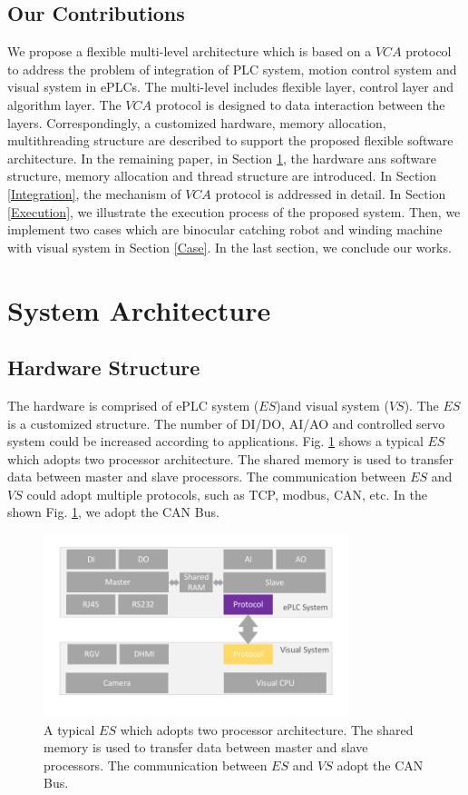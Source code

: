 \documentclass[journal,UTF8]{IEEEtran}
\begin{document}
\subsection{Our Contributions}
We propose a flexible multi-level architecture which is based on a $VCA$ protocol to address the problem of integration of PLC system, motion control system and visual system in ePLCs. The multi-level includes flexible layer, control layer and algorithm layer. The $VCA$ protocol is designed to data interaction between the layers. Correspondingly, a customized hardware, memory allocation, multithreading structure are described to support the proposed flexible software architecture.
In the remaining paper, in Section \ref{SystemStructure}, the hardware ans software structure, memory allocation and thread structure are introduced. In Section \ref{Integration}, the mechanism of $VCA$ protocol is addressed in detail. In Section \ref{Execution}, we illustrate the execution process of the proposed system. Then, we implement two cases which are binocular catching robot and winding machine with visual system in Section \ref{Case}. In the last section, we conclude our works.

\section{System Architecture}
\label{SystemStructure}
\subsection{Hardware Structure}
The hardware is comprised of ePLC system ($ES$)and visual system ($VS$). The $ES$ is a customized structure. The number of DI/DO, AI/AO and controlled servo system could be increased according to applications. Fig. \ref{fig:Hardware} shows a typical $ES$ which adopts two processor architecture. The shared memory is used to transfer data between master and slave processors. The communication between $ES$ and $VS$ could adopt multiple protocols, such as TCP, modbus, CAN, etc. In the shown Fig. \ref{fig:Hardware}, we adopt the CAN Bus.

\begin{figure}
	\centering
	\includegraphics[width=3.5in]{fig/Hardware.pdf}
	\caption{A typical $ES$ which adopts two processor architecture. The shared memory is used to transfer data between master and slave processors. The communication between $ES$ and $VS$ adopt the CAN Bus.}
	\label{fig:Hardware}
\end{figure}
\end{document}
